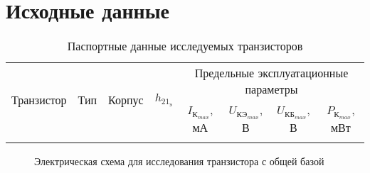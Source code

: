 \section{Исходные данные}

\begin{table} [htbp]
  \centering
  \caption{Паспортные данные исследуемых транзисторов}
  \begin{tabular}{| c | c | c | c | c | c | c | c |}
    \hline
     \multirow{2}{*}{Транзистор} & \multirow{2}{*}{Тип} & \multirow{2}{*}{Корпус} & \multirow{2}{*}{$ h_{21_{\text{э}}} $ } & \multicolumn{4}{c|}{Предельные эксплуатационные параметры} \\ \cline{5-8}
    & & & & $ I_{\text{К}_{max}} $, мА & $ U_{\text{КЭ}_{max}} $, В & $ U_{\text{КБ}_{max}} $, В & $ P_{\text{К}_{max}}$, мВт \\
    \hline
    & & & & & & & \\
    \hline
  \end{tabular}

\end{table}

\begin{figure}[h]
  \caption{Электрическая схема для исследования транзистора с общей базой}
\end{figure}

\clearpage
